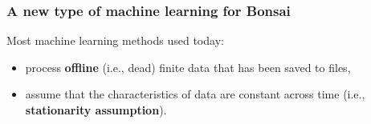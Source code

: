 \begin{frame}
    \frametitle{A new type of machine learning for Bonsai}

    Most machine learning methods used today:

    \begin{itemize}

        \item process \textbf{offline} (i.e., dead) finite data that has been saved to files,

        \item assume that the characteristics of data are constant across time
            (i.e., \textbf{stationarity assumption}).

    \end{itemize}


\end{frame}
